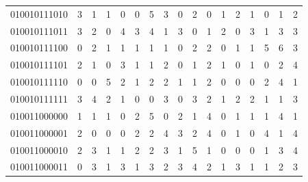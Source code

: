 \documentclass[10pt,a4paper]{article}
\begin{document}
\begin{longtable}{ |c|c|c|c|c|c|c|c|c|c|c|c|c|c|c|c|c| }
    010010111010              & 3                            & 1                                & 1                            & 0                              & 0   & 5   & 3   & 0   & 2   & 0   & 1   & 2   & 1   & 0   & 1   & 2   \\
    010010111011              & 3                            & 2                                & 0                            & 4                              & 3   & 4   & 1   & 3   & 0   & 1   & 2   & 0   & 3   & 1   & 3   & 3   \\
    010010111100              & 0                            & 2                                & 1                            & 1                              & 1   & 1   & 1   & 0   & 2   & 2   & 0   & 1   & 1   & 5   & 6   & 3   \\
    010010111101              & 2                            & 1                                & 0                            & 3                              & 1   & 1   & 2   & 0   & 1   & 2   & 1   & 0   & 1   & 0   & 2   & 4   \\
    010010111110              & 0                            & 0                                & 5                            & 2                              & 1   & 2   & 2   & 1   & 1   & 2   & 0   & 0   & 0   & 2   & 4   & 1   \\
    010010111111              & 3                            & 4                                & 2                            & 1                              & 0   & 0   & 3   & 0   & 3   & 2   & 1   & 2   & 2   & 1   & 1   & 3   \\
    010011000000              & 1                            & 1                                & 1                            & 0                              & 2   & 5   & 0   & 2   & 1   & 4   & 0   & 1   & 1   & 1   & 4   & 1   \\
    010011000001              & 2                            & 0                                & 0                            & 0                              & 2   & 2   & 4   & 3   & 2   & 4   & 0   & 1   & 0   & 4   & 1   & 4   \\
    010011000010              & 2                            & 3                                & 1                            & 1                              & 2   & 2   & 3   & 1   & 5   & 1   & 0   & 0   & 0   & 1   & 3   & 4   \\
    010011000011              & 0                            & 3                                & 1                            & 3                              & 1   & 3   & 2   & 3   & 4   & 2   & 1   & 3   & 1   & 1   & 2   & 3   \\

\end{longtable}
\end{document}
